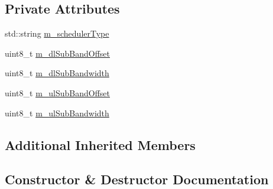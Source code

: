 \subsection*{Private Attributes}
\begin{DoxyCompactItemize}
\item 
std\+::string \hyperlink{classLteHardFrTestCase_ad7381bb278529dc0cb3102e5af645994}{m\+\_\+scheduler\+Type}
\item 
uint8\+\_\+t \hyperlink{classLteHardFrTestCase_a337571f3387698d9b8dba81858ea1dec}{m\+\_\+dl\+Sub\+Band\+Offset}
\item 
uint8\+\_\+t \hyperlink{classLteHardFrTestCase_a6e76310d5e2f2fbb3252b425f66ebd0d}{m\+\_\+dl\+Sub\+Bandwidth}
\item 
uint8\+\_\+t \hyperlink{classLteHardFrTestCase_a5855d83febfdbf617cc86a8acaa97504}{m\+\_\+ul\+Sub\+Band\+Offset}
\item 
uint8\+\_\+t \hyperlink{classLteHardFrTestCase_a466dbdebec3cfdf98011aa4a5de0ad08}{m\+\_\+ul\+Sub\+Bandwidth}
\end{DoxyCompactItemize}
\subsection*{Additional Inherited Members}


\subsection{Constructor \& Destructor Documentation}
